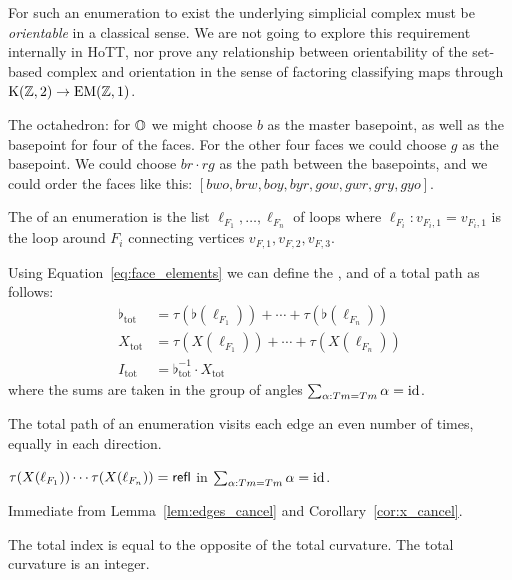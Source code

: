 \begin{mynote}
For such an enumeration to exist the underlying simplicial complex must be \emph{orientable} in a classical sense. We are not going to explore this requirement internally in HoTT, nor prove any relationship between orientability of the set-based complex and orientation in the sense of factoring classifying maps through \( \mathrm{K}(\mathbb{Z},2)\to\mathrm{EM}(\mathbb{Z},1) \).
\end{mynote}

\begin{myex}
The octahedron: for \( \mathbb{O} \) we might choose \( b \) as the master basepoint, as well as the basepoint for four of the faces. For the other four faces we could choose \( g \) as the basepoint. We could choose \( br\cdot rg \) as the path between the basepoints, and we could order the faces like this: \( [bwo, brw, boy, byr, gow, gwr, gry, gyo] \).
\end{myex}

\begin{mydef}
The  of an enumeration is the list \( \ell_{F_1},\ldots,\ell_{F_n} \) of loops where \( \ell_{F_i}:v_{F_i,1}=v_{F_i,1} \) is the loop around \( F_i \) connecting vertices \( v_{F,1}, v_{F,2}, v_{F,3} \).
\end{mydef}

\begin{mydef}
Using Equation~\ref{eq:face_elements} we can define the ,  and  of a total path as follows:
\begin{equation}
\label{eq:total_elements}
\begin{aligned}
\flat_\mathrm{tot}&=\tau(\flat(\ell_{F_1}))+\cdots+\tau(\flat(\ell_{F_n}))\\
X_\mathrm{tot}&=\tau(X(\ell_{F_1}))+\cdots+\tau(X(\ell_{F_n}))\\
I_\mathrm{tot}&=\flat_\mathrm{tot}^{-1}\cdot X_\mathrm{tot}
\end{aligned}
\end{equation}
where the sums are taken in the group of angles \( \sum_{\alpha:Tm=Tm}\alpha=\text{id} \).
\end{mydef}

\begin{mylemma}
\label{lem:edges_cancel}
The total path of an enumeration visits each edge an even number of times, equally in each direction.
\end{mylemma}

\begin{mythm}
\( \tau(X(\ell_{F_1}))\cdots\tau(X(\ell_{F_n}))=\mathsf{refl} \) in \( \sum_{\alpha:Tm=Tm}\alpha=\text{id} \). 
\end{mythm}
\begin{myproof}
Immediate from Lemma~\ref{lem:edges_cancel} and Corollary~\ref{cor:x_cancel}.
\end{myproof}

\begin{mycor}
The total index is equal to the opposite of the total curvature. The total curvature is an integer.
\end{mycor}

